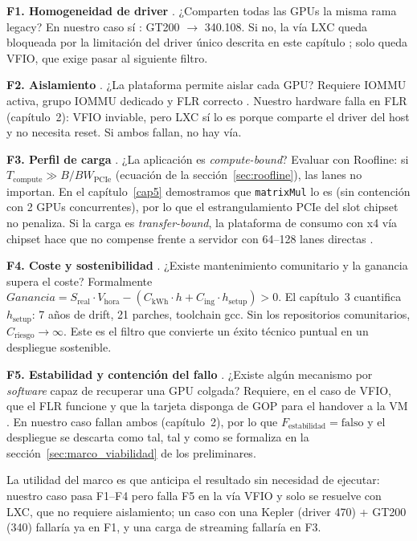 \textbf{F1. Homogeneidad de driver} \cite{nvidia_legacy_driver,nvidia_legacy_support}. ¿Comparten todas las GPUs la misma rama legacy? En nuestro caso sí \cite{michelboucey}: GT200 $\to$ 340.108. Si no, la vía LXC queda bloqueada por la limitación del driver único descrita en este capítulo \cite{nvidia_forum_multidriver}; solo queda VFIO, que exige pasar al siguiente filtro.

\textbf{F2. Aislamiento} \cite{kernel_vfio,proxmox_pci_passthrough,supermicro_gpu_passthrough}. ¿La plataforma permite aislar cada GPU? Requiere IOMMU activa, grupo IOMMU dedicado \cite{heiko_iommu_groups} y FLR correcto \cite{pcisig2022,amd_pg344_flr}. Nuestro hardware falla en FLR (capítulo~2): VFIO inviable, pero LXC sí lo es porque comparte el driver del host y no necesita reset. Si ambos fallan, no hay vía.

\textbf{F3. Perfil de carga} \cite{williams2009roofline,amdahl1967}. ¿La aplicación es \textit{compute-bound}? Evaluar con Roofline: si $T_{\text{compute}} \gg B/BW_{\text{PCIe}}$ (ecuación de la sección~\ref{sec:roofline}), las lanes no importan. En el capítulo~\ref{cap5} demostramos que \texttt{matrixMul} lo es (sin contención con 2 GPUs concurrentes), por lo que el estrangulamiento PCIe del slot chipset no penaliza. Si la carga es \textit{transfer-bound}, la plataforma de consumo con x4 vía chipset \cite{asusx670e,amd7950x} hace que no compense frente a servidor con 64--128 lanes directas \cite{pcisig2022}.

\textbf{F4. Coste y sostenibilidad} \cite{michelboucey,archlinuxjerry}. ¿Existe mantenimiento comunitario y la ganancia supera el coste? Formalmente $Ganancia = S_{\text{real}}\cdot V_{\text{hora}} - (C_{\text{kWh}}\cdot h + C_{\text{ing}}\cdot h_{\text{setup}}) > 0$. El capítulo~3 cuantifica $h_{\text{setup}}$: 7 años de drift, 21 parches, toolchain gcc. Sin los repositorios comunitarios, $C_{\text{riesgo}}\to\infty$. Este es el filtro que convierte un éxito técnico puntual en un despliegue sostenible.

\textbf{F5. Estabilidad y contención del fallo} \cite{amd_pg344_flr,uefi_gop_amd}. ¿Existe algún mecanismo por \textit{software} capaz de recuperar una GPU colgada? Requiere, en el caso de VFIO, que el FLR funcione \cite{pcisig2022,amd_pg344_flr} y que la tarjeta disponga de GOP para el handover a la VM \cite{uefi_gop_amd}. En nuestro caso fallan ambos (capítulo~2), por lo que $F_{\text{estabilidad}}=\text{falso}$ y el despliegue se descarta como tal, tal y como se formaliza en la sección~\ref{sec:marco_viabilidad} de los preliminares.

La utilidad del marco es que anticipa el resultado sin necesidad de ejecutar: nuestro caso pasa F1--F4 pero falla F5 en la vía VFIO y solo se resuelve con LXC, que no requiere aislamiento; un caso con una Kepler (driver 470) + GT200 (340) fallaría ya en F1, y una carga de streaming fallaría en F3.

